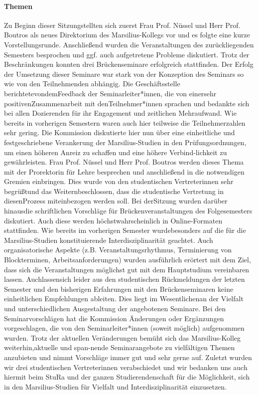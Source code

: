 \paragraph{Themen}
Zu Beginn dieser Sitzungstellten sich zuerst Frau Prof. Nüssel und Herr Prof. Boutros als neues Direktorium des Marsilius-Kollegs vor und es folgte eine kurze Vorstellungsrunde. Anschließend wurden  die Veranstaltungen  des  zurückliegenden  Semesters  besprochen  und  ggf.  auch  aufgetretene Probleme diskutiert. Trotz der Beschränkungen konnten drei Brückenseminare erfolgreich stattfinden. Der Erfolg der Umsetzung dieser Seminare war stark von der Konzeption des Seminars so wie von den Teilnehmenden abhängig. Die Geschäftsstelle berichtetevondemFeedback der Seminarleiter*innen, die von einersehr positivenZusammenarbeit mit denTeilnehmer*innen sprachen und bedankte sich bei allen Dozierenden für ihr Engagement und zeitlichen Mehraufwand. Wie bereits in vorherigen Semestern waren auch hier teilweise die Teilnehmerzahlen sehr gering. Die Kommission  diskutierte  hier  nun  über  eine  einheitliche  und  festgeschriebene  Verankerung  der  Marsilius-Studien in den Prüfungsordnungen, um einen höheren Anreiz zu schaffen und eine höhere Verbind-lichkeit  zu  gewährleisten.  Frau Prof.  Nüssel  und Herr  Prof.  Boutros werden dieses Thema  mit  der Prorektorin für Lehre besprechen und anschließend in die notwendigen Gremien einbringen. Dies wurde von den studentischen Vertreterinnen sehr begrüßtund das Weiternbeschlossen, dass die studentische Vertretung in diesenProzess miteinbezogen werden soll. Bei derSitzung wurden darüber hinausdie schriftlichen Vorschläge für Brückenveranstaltungen des Folgesemesters  diskutiert. Auch  diese  werden  höchstwahrscheinlich  in  Online-Formaten  stattfinden. Wie bereits im vorherigen Semester wurdebesonders auf die für die Marsilius-Studien konstituierende  Interdisziplinarität  geachtet.  Auch  organisatorische  Aspekte (z.B.  Veranstaltungsrhythmus, Terminierung von Blockterminen, Arbeitsanforderungen) wurden ausführlich erörtert mit dem Ziel, dass sich die Veranstaltungen möglichst gut mit dem Hauptstudium vereinbaren lassen. Auchlassensich leider aus den studentischen Rückmeldungen der letzten Semester und den bisherigen Erfahrungen mit  den  Brückenseminaren keine  einheitlichen  Empfehlungen  ableiten. Dies  liegt  im Wesentlichenan der Vielfalt und unterschiedlichen Ausgestaltung der angebotenen Seminare. Bei den Seminarvorschlägen hat die Kommission Änderungen oder Ergänzungen vorgeschlagen, die von den Seminarleiter*innen (soweit möglich) aufgenommen wurden. Trotz der aktuellen Veränderungen bemüht sich das Marsilius-Kolleg weiterhin,aktuelle und span-nende Seminarangebote zu vielfältigen Themen anzubieten und nimmt Vorschläge immer gut und sehr gerne auf. Zuletzt  wurden  wir  drei  studentischen  Vertreterinnen  verabschiedet  und  wir  bedanken  uns  auch hiermit beim StuRa und der ganzen Studierendenschaft für die Möglichkeit, sich in den Marsilius-Studien für Vielfalt und Interdisziplinarität einzusetzen.
